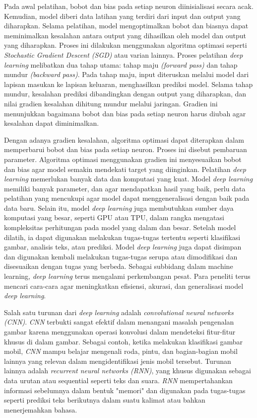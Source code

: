 Pada awal pelatihan, bobot dan bias pada setiap neuron diinisialisasi secara acak. Kemudian, model diberi data latihan yang terdiri dari input dan output yang diharapkan. Selama pelatihan, model mengoptimalkan bobot dan biasnya dapat meminimalkan kesalahan antara output yang dihasilkan oleh model dan output yang diharapkan. Proses ini dilakukan menggunakan algoritma optimasi seperti \textit{Stochastic Gradient Descent (SGD)} atau varian lainnya. Proses pelatihan \textit{deep learning} melibatkan dua tahap utama: tahap maju \textit{(forward pass)} dan tahap mundur \textit{(backward pass)}. Pada tahap maju, input diteruskan melalui model dari lapisan masukan ke lapisan keluaran, menghasilkan prediksi model. Selama tahap mundur, kesalahan prediksi dibandingkan dengan output yang diharapkan, dan nilai gradien kesalahan dihitung mundur melalui jaringan. Gradien ini menunjukkan bagaimana bobot dan bias pada setiap neuron harus diubah agar kesalahan dapat diminimalkan. \cite{deng2014deep}

Dengan adanya gradien kesalahan, algoritma optimasi dapat diterapkan dalam memperbarui bobot dan bias pada setiap neuron. Proses ini disebut pembaruan parameter. Algoritma optimasi menggunakan gradien ini menyesuaikan bobot dan bias agar model semakin mendekati target yang diinginkan. Pelatihan \textit{deep learning} memerlukan banyak data dan komputasi yang kuat. Model \textit{deep learning} memiliki banyak parameter, dan agar mendapatkan hasil yang baik, perlu data pelatihan yang mencukupi agar model dapat menggeneralisasi dengan baik pada data baru. Selain itu, model \textit{deep learning} juga membutuhkan sumber daya komputasi yang besar, seperti GPU atau TPU, dalam rangka mengatasi kompleksitas perhitungan pada model yang dalam dan besar. Setelah model dilatih, ia dapat digunakan melakukan tugas-tugas tertentu seperti klasifikasi gambar, analisis teks, atau prediksi. Model \textit{deep learning} juga dapat disimpan dan digunakan kembali melakukan tugas-tugas serupa atau dimodifikasi dan disesuaikan dengan tugas yang berbeda. Sebagai subbidang dalam machine learning, \textit{deep learning} terus mengalami perkembangan pesat. Para peneliti terus mencari cara-cara agar meningkatkan efisiensi, akurasi, dan generalisasi model \textit{deep learning}. \cite{smith2007teaching}

Salah satu turunan dari \textit{deep learning} adalah \textit{convolutional neural networks (CNN)}. \textit{CNN} terbukti sangat efektif dalam menangani masalah pengenalan gambar karena menggunakan operasi konvolusi dalam mendeteksi fitur-fitur khusus di dalam gambar. Sebagai contoh, ketika melakukan klasifikasi gambar mobil, \textit{CNN} mampu belajar mengenali roda, pintu, dan bagian-bagian mobil lainnya yang relevan dalam mengidentifikasi jenis mobil tersebut. Turunan lainnya adalah \textit{recurrent neural networks (RNN)}, yang khusus digunakan sebagai data urutan atau sequential seperti teks dan suara. \textit{RNN} mempertahankan informasi sebelumnya dalam bentuk "memori" dan digunakan pada tugas-tugas seperti prediksi teks berikutnya dalam suatu kalimat atau bahkan menerjemahkan bahasa.

